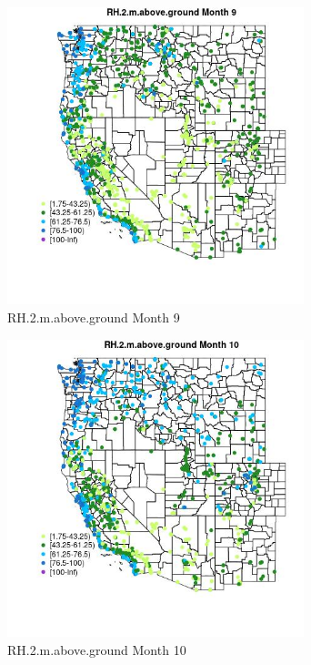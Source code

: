 \begin{figure} 
\centering  
\includegraphics[width=0.77\textwidth]{Code_Outputs/Report_ML_input_PM25_Step4_part_f_de_duplicated_aves_prioritize_24hr_obswNAs_MapObsMo9RH2maboveground.jpg} 
\caption{\label{fig:Report_ML_input_PM25_Step4_part_f_de_duplicated_aves_prioritize_24hr_obswNAsMapObsMo9RH2maboveground}RH.2.m.above.ground Month 9} 
\end{figure} 
 

\begin{figure} 
\centering  
\includegraphics[width=0.77\textwidth]{Code_Outputs/Report_ML_input_PM25_Step4_part_f_de_duplicated_aves_prioritize_24hr_obswNAs_MapObsMo10RH2maboveground.jpg} 
\caption{\label{fig:Report_ML_input_PM25_Step4_part_f_de_duplicated_aves_prioritize_24hr_obswNAsMapObsMo10RH2maboveground}RH.2.m.above.ground Month 10} 
\end{figure} 
 

